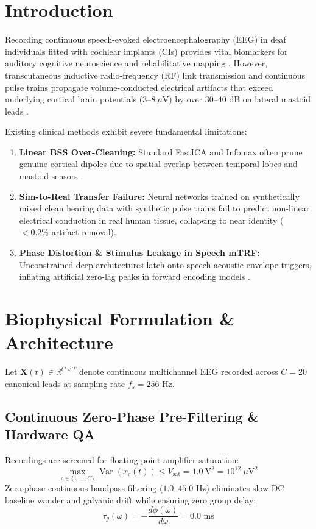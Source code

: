 \documentclass[11pt]{article}
\begin{document}
\section{Introduction}
Recording continuous speech-evoked electroencephalography (EEG) in deaf individuals fitted with cochlear implants (CIs) provides vital biomarkers for auditory cognitive neuroscience and rehabilitative mapping \cite{somers2019eeg}. However, transcutaneous inductive radio-frequency (RF) link transmission and continuous pulse trains propagate volume-conducted electrical artifacts that exceed underlying cortical brain potentials ($3\text{--}8\ \mu\text{V}$) by over $30\text{--}40\text{ dB}$ on lateral mastoid leads \cite{hofmann2012artefact}.

Existing clinical methods exhibit severe fundamental limitations:
\begin{enumerate}
    \item \textbf{Linear BSS Over-Cleaning:} Standard FastICA and Infomax often prune genuine cortical dipoles due to spatial overlap between temporal lobes and mastoid sensors \cite{hofmann2012artefact}.
    \item \textbf{Sim-to-Real Transfer Failure:} Neural networks trained on synthetically mixed clean hearing data with synthetic pulse trains fail to predict non-linear electrical conduction in real human tissue, collapsing to near identity ($<0.2\%$ artifact removal).
    \item \textbf{Phase Distortion \& Stimulus Leakage in Speech mTRF:} Unconstrained deep architectures latch onto speech acoustic envelope triggers, inflating artificial zero-lag peaks in forward encoding models \cite{crosse2016multivariate}.
\end{enumerate}

\section{Biophysical Formulation \& Architecture}
Let $\mathbf{X}(t) \in \mathbb{R}^{C \times T}$ denote continuous multichannel EEG recorded across $C=20$ canonical leads at sampling rate $f_s = 256\text{ Hz}$.

\subsection{Continuous Zero-Phase Pre-Filtering \& Hardware QA}
Recordings are screened for floating-point amplifier saturation:
\begin{equation}
\max_{c \in \{1,\dots,C\}} \operatorname{Var}(x_c(t)) \le V_{\text{sat}} = 1.0\ \text{V}^2 = 10^{12}\ \mu\text{V}^2
\end{equation}
Zero-phase continuous bandpass filtering ($1.0\text{--}45.0\text{ Hz}$) eliminates slow DC baseline wander and galvanic drift while ensuring zero group delay:
\begin{equation}
\tau_g(\omega) = -\frac{d\phi(\omega)}{d\omega} = 0.0\text{ ms}
\end{equation}
\end{document}
